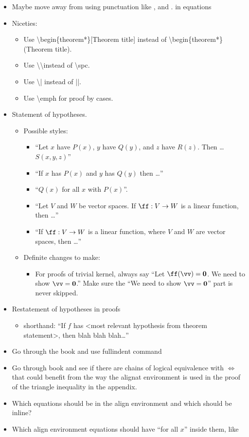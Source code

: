 \begin{itemize}
    \item Maybe move away from using punctuation like , and . in equations
    \item Niceties:
    \begin{itemize}
    	\item Use \textbackslash begin\{theorem*\}[Theorem title] instead of \textbackslash begin\{theorem*\} (Theorem title).
    	\item Use \textbackslash \textbackslash instead of \textbackslash spc.
    	\item Use \textbackslash | instead of ||.
    	\item Use \textbackslash emph for proof by cases.
    \end{itemize}
    \item Statement of hypotheses.
    \begin{itemize}
        \item Possible styles:
        \begin{itemize}
            \item “Let $x$ have $P(x)$, $y$ have $Q(y)$, and $z$ have $R(z)$. Then … $S(x, y, z)$”
            \item “If $x$ has $P(x)$ and $y$ has $Q(y)$ then …”
            \item “$Q(x)$ for all $x$ with $P(x)$”.
            \item “Let $V$ and $W$ be vector spaces. If $\ff:V \rightarrow W$ is a linear function, then …”
            \item “If $\ff:V \rightarrow W$ is a linear function, where $V$ and $W$ are vector spaces, then …”
        \end{itemize}
        \item Definite changes to make:
        \begin{itemize}
            \item For proofs of trivial kernel, always say ``Let $\ff(\vv) = \mathbf{0}$. We need to show $\vv = \mathbf{0}$.'' Make sure the ``We need to show $\vv = \mathbf{0}$'' part is never skipped.
        \end{itemize}
    \end{itemize}
    \item Restatement of hypotheses in proofs
    \begin{itemize}
        \item shorthand: “If $f$ has <most relevant hypothesis from theorem statement>, then blah blah blah…” 
    \end{itemize}
    \item Go through the book and use fullindent command
    \item Go through book and see if there are chains of logical equivalence with $\iff$ that could benefit from the way the alignat environment is used in the proof of the triangle inequality in the appendix.
    \item Which equations should be in the align environment and which should be inline?
    \item Which align environment equations should have ``for all $x$'' inside them, like


\end{itemize}
